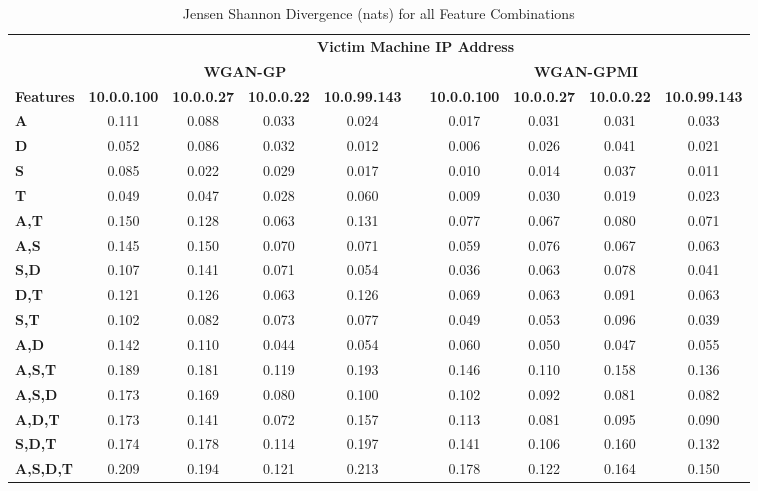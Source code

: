 \begin{table}[!htbp]
	\caption{Jensen Shannon Divergence (nats) for all Feature Combinations}
	\label{tab:jsd}
	\centering
	\begin{adjustbox}{angle=90}
		\begin{tabular}{l|c|c|c|c|c|c|c|c|c|}
			\multicolumn{1}{c|}{} & \multicolumn{9}{c|}{\textbf{Victim Machine IP Address}} \\
			\multicolumn{1}{c|}{} & \multicolumn{4}{c|}{\textbf{WGAN-GP}} &  & \multicolumn{4}{c|}{\textbf{WGAN-GPMI}} \\
			\multicolumn{1}{c|}{\textbf{Features}} & \textbf{10.0.0.100} & \textbf{10.0.0.27} & \textbf{10.0.0.22} & \textbf{10.0.99.143} & \textbf{} & \textbf{10.0.0.100} & \textbf{10.0.0.27} & \textbf{10.0.0.22} & \textbf{10.0.99.143} \\ \hline
			\textbf{A} & 0.111 & 0.088 & 0.033 & 0.024 &  & 0.017 & 0.031 & 0.031 & 0.033 \\
			\textbf{D} & 0.052 & 0.086 & 0.032 & 0.012 &  & 0.006 & 0.026 & 0.041 & 0.021 \\
			\textbf{S} & 0.085 & 0.022 & 0.029 & 0.017 &  & 0.010 & 0.014 & 0.037 & 0.011 \\
			\textbf{T} & 0.049 & 0.047 & 0.028 & 0.060 &  & 0.009 & 0.030 & 0.019 & 0.023 \\ \hline
			\textbf{A,T} & 0.150 & 0.128 & 0.063 & 0.131 &  & 0.077 & 0.067 & 0.080 & 0.071 \\
			\textbf{A,S} & 0.145 & 0.150 & 0.070 & 0.071 &  & 0.059 & 0.076 & 0.067 & 0.063 \\
			\textbf{S,D} & 0.107 & 0.141 & 0.071 & 0.054 &  & 0.036 & 0.063 & 0.078 & 0.041 \\
			\textbf{D,T} & 0.121 & 0.126 & 0.063 & 0.126 &  & 0.069 & 0.063 & 0.091 & 0.063 \\
			\textbf{S,T} & 0.102 & 0.082 & 0.073 & 0.077 &  & 0.049 & 0.053 & 0.096 & 0.039 \\
			\textbf{A,D} & 0.142 & 0.110 & 0.044 & 0.054 &  & 0.060 & 0.050 & 0.047 & 0.055 \\ \hline
			\textbf{A,S,T} & 0.189 & 0.181 & 0.119 & 0.193 &  & 0.146 & 0.110 & 0.158 & 0.136 \\
			\textbf{A,S,D} & 0.173 & 0.169 & 0.080 & 0.100 &  & 0.102 & 0.092 & 0.081 & 0.082 \\
			\textbf{A,D,T} & 0.173 & 0.141 & 0.072 & 0.157 &  & 0.113 & 0.081 & 0.095 & 0.090 \\
			\textbf{S,D,T} & 0.174 & 0.178 & 0.114 & 0.197 &  & 0.141 & 0.106 & 0.160 & 0.132 \\ \hline
			\textbf{A,S,D,T} & 0.209 & 0.194 & 0.121 & 0.213 &  & 0.178 & 0.122 & 0.164 & 0.150 \\
		\end{tabular}
	\end{adjustbox}
\end{table}


